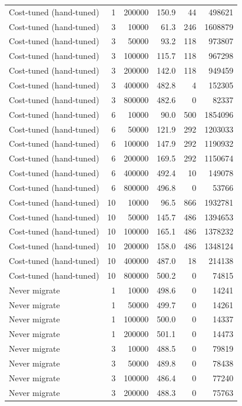 \begin{table}[h]
\begin{tabular}{@{}lrrrrr@{}}
Cost-tuned (hand-tuned) & 1 & 200000 & 150.9 & 44 & 498621 \\
Cost-tuned (hand-tuned) & 3 & 10000 & 61.3 & 246 & 1608879 \\
Cost-tuned (hand-tuned) & 3 & 50000 & 93.2 & 118 & 973807 \\
Cost-tuned (hand-tuned) & 3 & 100000 & 115.7 & 118 & 967298 \\
Cost-tuned (hand-tuned) & 3 & 200000 & 142.0 & 118 & 949459 \\
Cost-tuned (hand-tuned) & 3 & 400000 & 482.8 & 4 & 152305 \\
Cost-tuned (hand-tuned) & 3 & 800000 & 482.6 & 0 & 82337 \\
Cost-tuned (hand-tuned) & 6 & 10000 & 90.0 & 500 & 1854096 \\
Cost-tuned (hand-tuned) & 6 & 50000 & 121.9 & 292 & 1203033 \\
Cost-tuned (hand-tuned) & 6 & 100000 & 147.9 & 292 & 1190932 \\
Cost-tuned (hand-tuned) & 6 & 200000 & 169.5 & 292 & 1150674 \\
Cost-tuned (hand-tuned) & 6 & 400000 & 492.4 & 10 & 149078 \\
Cost-tuned (hand-tuned) & 6 & 800000 & 496.8 & 0 & 53766 \\
Cost-tuned (hand-tuned) & 10 & 10000 & 96.5 & 866 & 1932781 \\
Cost-tuned (hand-tuned) & 10 & 50000 & 145.7 & 486 & 1394653 \\
Cost-tuned (hand-tuned) & 10 & 100000 & 165.1 & 486 & 1378232 \\
Cost-tuned (hand-tuned) & 10 & 200000 & 158.0 & 486 & 1348124 \\
Cost-tuned (hand-tuned) & 10 & 400000 & 487.0 & 18 & 214138 \\
Cost-tuned (hand-tuned) & 10 & 800000 & 500.2 & 0 & 74815 \\
Never migrate & 1 & 10000 & 498.6 & 0 & 14241 \\
Never migrate & 1 & 50000 & 499.7 & 0 & 14261 \\
Never migrate & 1 & 100000 & 500.0 & 0 & 14337 \\
Never migrate & 1 & 200000 & 501.1 & 0 & 14473 \\
Never migrate & 3 & 10000 & 488.5 & 0 & 79819 \\
Never migrate & 3 & 50000 & 489.8 & 0 & 78438 \\
Never migrate & 3 & 100000 & 486.4 & 0 & 77240 \\
Never migrate & 3 & 200000 & 488.3 & 0 & 75763 \\

\end{tabular}
\end{table}
